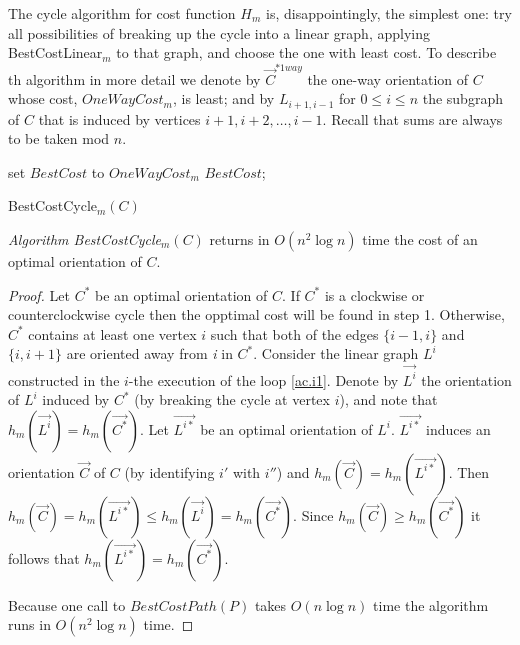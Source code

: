 The cycle algorithm for cost function $H_m$ is, disappointingly, the simplest one: 
try all possibilities of breaking up the cycle into a linear graph, applying 
BestCostLinear$_m$ to that graph, and choose the one with least cost. 
To describe th algorithm in more detail 
we denote by $\vec{C}^{*1way}$ the one-way orientation of $C$
whose cost, ${OneWayCost_m}$, is least; and by $L_{i+1,i-1}$ for $0\leq i \leq n$ 
the subgraph of $C$
that is induced by vertices $i+1,i+2,\ldots, i-1$. Recall that sums are 
always to be taken mod $n$.
\begin{algorithm}
set $BestCost$ to $OneWayCost_m$
\;
	\label{ac.i1} 
	\Return $BestCost$; 
	\caption{BestCostCycle$_m(C)$}
	\label{algo:oc-m}
\end{algorithm}

\bigskip
\begin{theorem}
\emph{Algorithm BestCostCycle}$_m(C)$ returns in $O(n^2 \log n)$ time the cost of an optimal 
orientation of $C$.
\end{theorem}
\begin{proof}

Let $C^*$ be an optimal orientation 
of $C$.
If $C^*$ is a clockwise or counterclockwise cycle then the opptimal cost will be found in step 1.
Otherwise, $C^*$ contains at least one vertex $i$ such that both of the edges $\{i-1,i\}$ and $\{i,i+1\}$
are oriented away from \textit{i} in $C^*$.  Consider the linear graph $L^i$ constructed in
the $i$-the execution of the loop \ref{ac.i1}. Denote by $\vec{L^i}$ the orientation of $L^i$ 
induced by $C^*$  (by breaking the cycle at vertex $i$), and note that 
$h_m(\vec{L^i})=h_m(\vec{C^*})$. Let $\vec{L^{i*}}$ be an optimal orientation of $L^i$.
$\vec{L^{i*}}$ induces an orientation $\vec{C}$ of $C$ (by identifying $i'$ with $i''$)
and $h_m(\vec{C})=h_m(\vec{L^{i*}})$.  
Then $h_m(\vec{C})=h_m(\vec{L^{i*}})\leq h_m(\vec{L^i})=h_m(\vec{C^*})$.
Since $h_m(\vec{C})\geq h_m(\vec{C^*})$ it follows that $h_m(\vec{L^{i*}})= h_m(\vec{C^*})$.

Because one call to $BestCostPath(P)$ takes $O(n \log n)$ time the algorithm runs in $O(n^2 \log n)$ time.
\end{proof}